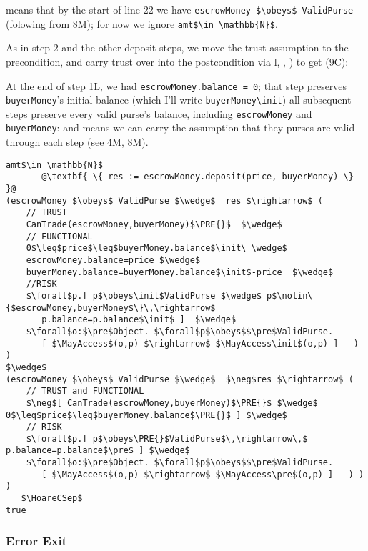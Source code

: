 
\noindent {} means that by the start of line 22 we have
\lstinline+escrowMoney $\obeys$ ValidPurse+ (folowing from 8M); for
now we ignore \lstinline+amt$\in \mathbb{N}$+.

As in step 2 and the other deposit steps, we move the trust assumption
to the precondition, and carry trust over into the postcondition
via  l, , ) to get (9C):

At the end of step 1L, we had \lstinline+escrowMoney.balance = 0+;
that step preserves \lstinline+buyerMoney+'s initial balance (which
I'll write \lstinline+buyerMoney\init+) all subsequent steps preserve
every valid purse's balance, including \lstinline+escrowMoney+ and
\lstinline+buyerMoney+: and  means we can carry
the assumption that they purses are valid through each step (see 4M, 8M).

\begin{lstlisting}[escapechar=@]
amt$\in \mathbb{N}$
       @\textbf{ \{ res := escrowMoney.deposit(price, buyerMoney) \} }@
(escrowMoney $\obeys$ ValidPurse $\wedge$  res $\rightarrow$ (
    // TRUST
    CanTrade(escrowMoney,buyerMoney)$\PRE{}$  $\wedge$
    // FUNCTIONAL
    0$\leq$price$\leq$buyerMoney.balance$\init\ \wedge$
    escrowMoney.balance=price $\wedge$
    buyerMoney.balance=buyerMoney.balance$\init$-price  $\wedge$
    //RISK
    $\forall$p.[ p$\obeys\init$ValidPurse $\wedge$ p$\notin\{$escrowMoney,buyerMoney$\}\,\rightarrow$
       p.balance=p.balance$\init$ ]  $\wedge$
    $\forall$o:$\pre$Object. $\forall$p$\obeys$$\pre$ValidPurse.
       [ $\MayAccess$(o,p) $\rightarrow$ $\MayAccess\init$(o,p) ]   ) )
$\wedge$
(escrowMoney $\obeys$ ValidPurse $\wedge$  $\neg$res $\rightarrow$ (
    // TRUST and FUNCTIONAL
    $\neg$[ CanTrade(escrowMoney,buyerMoney)$\PRE{}$ $\wedge$ 0$\leq$price$\leq$buyerMoney.balance$\PRE{}$ ] $\wedge$
    // RISK
    $\forall$p.[ p$\obeys\PRE{}$ValidPurse$\,\rightarrow\,$ p.balance=p.balance$\pre$ ] $\wedge$
    $\forall$o:$\pre$Object. $\forall$p$\obeys$$\pre$ValidPurse.
       [ $\MayAccess$(o,p) $\rightarrow$ $\MayAccess\pre$(o,p) ]   ) ) )
   $\HoareCSep$
true
\end{lstlisting}


\subsubsection{Error Exit}

